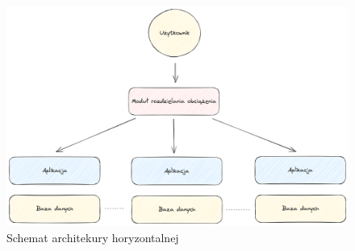 \begin{figure}[!hb]
	\centering \includegraphics[width=1\linewidth]{rysunki/horizontal_archtecture.png}
	\caption{Schemat architekury horyzontalnej}
	\label{rys:horizontalArchitecture}
\end{figure}
